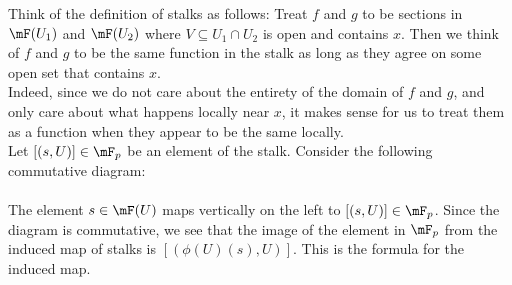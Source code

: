 \documentclass[a4paper]{article}
\begin{document}
Think of the definition of stalks as follows: Treat $f$ and $g$ to be sections in $\mF(U_1)$ and $\mF(U_2)$ where $V\subseteq U_1\cap U_2$ is open and contains $x$. Then we think of $f$ and $g$ to be the same function in the stalk as long as they agree on some open set that contains $x$. \\

Indeed, since we do not care about the entirety of the domain of $f$ and $g$, and only care about what happens locally near $x$, it makes sense for us to treat them as a function when they appear to be the same locally. \\

Let $[(s,U)]\in\mF_p$ be an element of the stalk. Consider the following commutative diagram: \\
 \\
The element $s\in\mF(U)$ maps vertically on the left to $[(s,U)]\in\mF_p$. Since the diagram is commutative, we see that the image of the element in $\mF_p$ from the induced map of stalks is $[(\phi(U)(s),U)]$. This is the formula for the induced map. 
\end{document}
